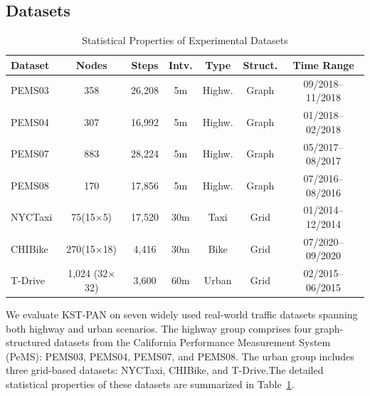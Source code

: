 \documentclass[5p,times,authoryear]{elsarticle}
\begin{document}
\subsection{Datasets}


\begin{table}[!t]
\centering
\caption{Statistical Properties of Experimental Datasets}
\label{tab:data_desc}
 \footnotesize
\setlength{\tabcolsep}{3pt} %
\begin{tabularx}{\columnwidth}{@{}l c c c c c c@{}}
\toprule
\textbf{Dataset} & \textbf{Nodes} & \textbf{Steps} & \textbf{Intv.} & \textbf{Type} & \textbf{Struct.} & \textbf{Time Range} \\
\midrule
PEMS03 & 358 & 26,208 & 5m & Highw. & Graph & 09/2018--11/2018 \\
PEMS04 & 307 & 16,992 & 5m & Highw. & Graph & 01/2018--02/2018 \\
PEMS07 & 883 & 28,224 & 5m & Highw. & Graph & 05/2017--08/2017 \\
PEMS08 & 170 & 17,856 & 5m & Highw. & Graph & 07/2016--08/2016 \\
\midrule
NYCTaxi & 75(15$\times$5) & 17,520 & 30m & Taxi & Grid & 01/2014--12/2014 \\
CHIBike & 270(15$\times$18) & 4,416 & 30m & Bike & Grid & 07/2020--09/2020 \\
T-Drive & 1,024 (32$\times$32) & 3,600 & 60m & Urban & Grid & 02/2015--06/2015 \\
\bottomrule
\end{tabularx}
\end{table}


We evaluate KST-PAN on seven widely used real-world traffic datasets spanning both highway and urban scenarios. The highway group comprises four graph-structured datasets from the California Performance Measurement System (PeMS)\citep{song2020spatial}: PEMS03, PEMS04, PEMS07, and PEMS08. The urban group includes three grid-based datasets: NYCTaxi\citep{liu2021dynamic}, CHIBike\citep{wang2021libcity}, and T-Drive\citep{pan2019urban}.The detailed statistical properties of these datasets are summarized in Table~\ref{tab:data_desc}.


\end{document}
